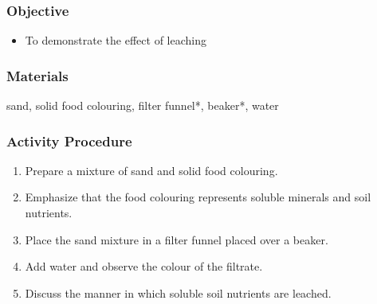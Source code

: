 \subsubsection{Objective}
\begin{itemize}
\item{To demonstrate the effect of leaching}
\end{itemize}

\subsubsection{Materials}
sand, solid food colouring, filter funnel*, beaker*, water

\subsubsection{Activity Procedure}
\begin{enumerate}
\item{Prepare a mixture of sand and solid food colouring.}
\item{Emphasize that the food colouring represents soluble minerals and soil nutrients.}
\item{Place the sand mixture in a filter funnel placed over a beaker.}
\item{Add water and observe the colour of the filtrate.}
\item{Discuss the manner in which soluble soil nutrients are leached.}
\end{enumerate}